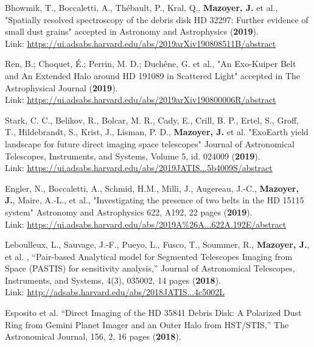 \documentclass[11pt,a4paper, french]{article}
\begin{document}
\begin{etaremune}
\item Bhowmik, T., Boccaletti, A., Thébault, P., Kral, Q., \textbf{Mazoyer, J.} et al.,
"Spatially resolved spectroscopy of the debris disk HD 32297: Further evidence of small dust grains"
accepted in Astronomy and Astrophysics (\textbf{2019}).\\
Link: \textcolor{BrickRed}{\underline{\url{https://ui.adsabs.harvard.edu/abs/2019arXiv190808511B/abstract}}}
\item Ren, B.; Choquet, É.; Perrin, M. D.; Duchêne, G. et al., "An Exo-Kuiper Belt and An Extended Halo around HD 191089 in Scattered Light"
accepted in The Astrophysical Journal (\textbf{2019}).\\
Link: \textcolor{BrickRed}{\underline{\url{https://ui.adsabs.harvard.edu/abs/2019arXiv190800006R/abstract}}}
\item Stark, C. C., Belikov, R., Bolcar, M. R., Cady, E., Crill, B. P., Ertel, S., Groff, T., Hildebrandt, S., Krist, J., Lisman, P. D., \textbf{Mazoyer, J.} et al.
"ExoEarth yield landscape for future direct imaging space telescopes"
Journal of Astronomical Telescopes, Instruments, and Systems, Volume 5, id. 024009 (\textbf{2019}).\\
Link: \textcolor{BrickRed}{\underline{\url{https://ui.adsabs.harvard.edu/abs/2019JATIS...5b4009S/abstract}}}
\item Engler, N., Boccaletti, A., Schmid, H.M., Milli, J., Augereau, J.-C., \textbf{Mazoyer, J.}, Maire, A.-L., et al., "Investigating the presence of two belts in the HD 15115 system"
Astronomy and Astrophysics 622, A192, 22 pages (\textbf{2019}).\\
Link: \textcolor{BrickRed}{\underline{\url{https://ui.adsabs.harvard.edu/abs/2019A\%26A...622A.192E/abstract}}}
\item Leboulleux, L., Sauvage, J.-F., Pueyo, L.,  Fusco, T., Soummer, R., \textbf{Mazoyer, J.}, et al. , “Pair-based Analytical model for Segmented Telescopes Imaging from Space (PASTIS) for sensitivity analysis,” Journal of Astronomical Telescopes, Instruments, and Systems, 4(3), 035002, 14 pages  (\textbf{2018}).\\
Link: \textcolor{BrickRed}{\underline{\url{http://adsabs.harvard.edu/abs/2018JATIS...4c5002L}}}
\item Esposito et al. “Direct Imaging of the HD 35841 Debris Disk: A Polarized Dust Ring from Gemini Planet Imager and an Outer Halo from HST/STIS,” The Astronomical Journal, 156, 2, 16 pages (\textbf{2018}).\\

\end{etaremune}
\end{document}

